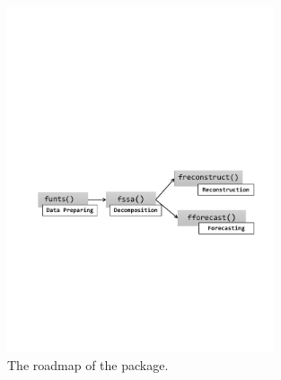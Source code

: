 \begin{figure}[b!]
	\centering
	\includegraphics[page=1,width=0.7\textwidth]{figures/roadmap.pdf}
	\caption{The roadmap of the  package.}
	\label{fig:roadpap}
\end{figure}
